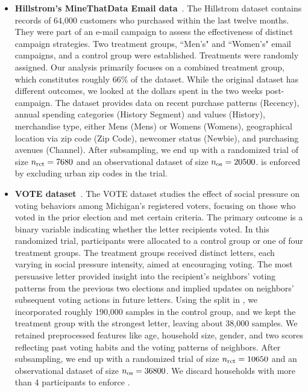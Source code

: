 \begin{itemize}
    \item \textbf{Hillstrom's MineThatData Email data}~\citep{hillstrom2008}. The Hillstrom dataset contains records of 64,000 customers who purchased within the last twelve months. They were part of an e-mail campaign to assess the effectiveness of distinct campaign strategies. Two treatment groups, ``Men’s" and ``Women’s" email campaigns, and a control group were established. Treatments were randomly assigned. Our analysis primarily focuses on a combined treatment group, which constitutes roughly 66\% of the dataset. While the original dataset has different outcomes, we looked at the dollars spent in the two weeks post-campaign. The dataset provides data on recent purchase patterns (Recency), annual spending categories (History Segment) and values (History), merchandise type, either Mens (Mens) or Womens (Womens), geographical location via zip code (Zip Code), newcomer status (Newbie), and purchasing avenues (Channel). After subsampling, we end up with a randomized trial of size $n_{\operatorname{rct}}=7680$ and an observational dataset of size $n_{\operatorname{os}}=20500$.  is enforced by excluding urban zip codes in the trial.

    \item \textbf{VOTE dataset}~\citep{gerber2008social}. The VOTE dataset studies the effect of social pressure on voting behaviors among Michigan's registered voters, focusing on those who voted in the prior election and met certain criteria. The primary outcome is a binary variable indicating whether the letter recipients voted. In this randomized trial, participants were allocated to a control group or one of four treatment groups. The treatment groups received distinct letters, each varying in social pressure intensity, aimed at encouraging voting. The most persuasive letter provided insight into the recipient's neighbors' voting patterns from the previous two elections and implied updates on neighbors' subsequent voting actions in future letters. Using the split in \citep{stutz2023}, we incorporated roughly 190,000 samples in the control group, and we kept the treatment group with the strongest letter, leaving about 38,000 samples. We retained preprocessed features like age, household size, gender, and two scores reflecting past voting habits and the voting patterns of neighbors. After subsampling, we end up with a randomized trial of size $n_{\operatorname{rct}}=10650$ and an observational dataset of size $n_{\operatorname{os}}=36800$.  We discard households with more than 4 participants to enforce .


\end{itemize}
